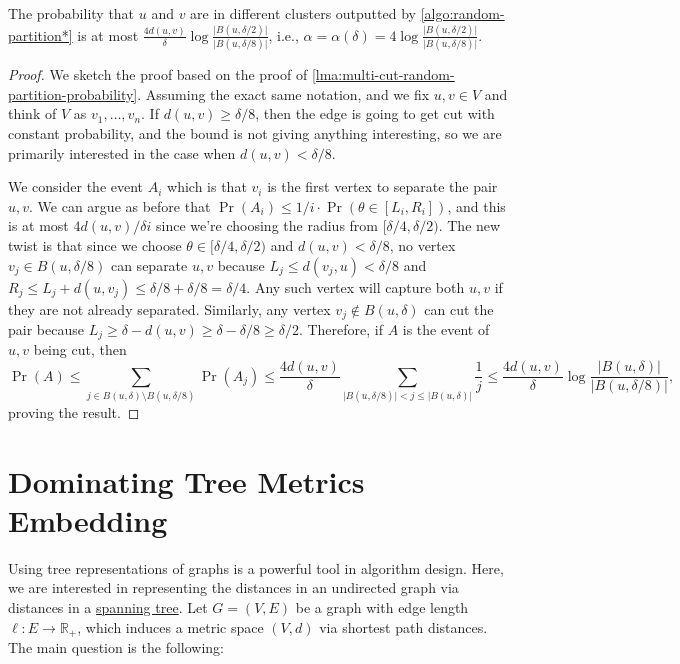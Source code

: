 \begin{theorem}\label{thm:random-partition*}
	The probability that \(u\) and \(v\) are in different clusters outputted by \autoref{algo:random-partition*} is at most \(\frac{4 d(u, v)}{\delta } \log \frac{\lvert B(u, \delta / 2) \rvert }{\lvert B(u, \delta / 8) \rvert }\), i.e., \(\alpha = \alpha (\delta ) = 4 \log \frac{\lvert B(u, \delta / 2) \rvert }{\lvert B(u, \delta / 8) \rvert }\).
\end{theorem}
\begin{proof}
	We sketch the proof based on the proof of \autoref{lma:multi-cut-random-partition-probability}. Assuming the exact same notation, and we fix \(u, v \in V\) and think of \(V\) as \(v_1, \dots , v_n\). If \(d(u, v) \geq \delta / 8\), then the edge is going to get cut with constant probability, and the bound is not giving anything interesting, so we are primarily interested in the case when \(d(u, v) < \delta / 8\).

	We consider the event \(A_i\) which is that \(v_i\) is the first vertex to separate the pair \(u, v\). We can argue as before that \(\Pr(A_i) \leq 1 / i \cdot \Pr(\theta \in [L_i, R_i])\), and this is at most \(4d(u, v) / \delta i\) since we're choosing the radius from \([\delta / 4, \delta / 2)\). The new twist is that since we choose \(\theta \in [\delta / 4, \delta / 2)\) and \(d(u, v) <\delta / 8\), no vertex \(v_j \in B(u, \delta / 8)\) can separate \(u, v\) because \(L_j \leq d(v_j, u) < \delta / 8\) and \(R_j \leq L_j + d(u, v_j) \leq \delta / 8 + \delta / 8 = \delta / 4\). Any such vertex will capture both \(u, v\) if they are not already separated. Similarly, any vertex \(v_j \notin B(u, \delta )\) can cut the pair because \(L_j \geq \delta - d(u, v) \geq \delta - \delta / 8 \geq \delta / 2\). Therefore, if \(A\) is the event of \(u, v\) being cut, then
	\[
		\Pr(A)
		\leq \sum_{j \in B(u, \delta ) \setminus B(u, \delta / 8)} \Pr(A_j)
		\leq \frac{4d(u, v)}{\delta } \sum_{\lvert B(u, \delta / 8) \rvert < j \leq \lvert B(u, \delta ) \rvert } \frac{1}{j}
		\leq \frac{4 d(u, v)}{\delta } \log \frac{\lvert B(u, \delta ) \rvert }{\lvert B(u, \delta / 8) \rvert },
	\]
	proving the result.
\end{proof}

\section{Dominating Tree Metrics Embedding}
Using tree representations of graphs is a powerful tool in algorithm design. Here, we are interested in representing the distances in an undirected graph via distances in a \hyperref[def:spanning-tree]{spanning tree}. Let \(G = (V, E)\) be a graph with edge length \(\ell \colon E \to \mathbb{R} _{+}\), which induces a metric space \((V, d)\) via shortest path distances. The main question is the following:

